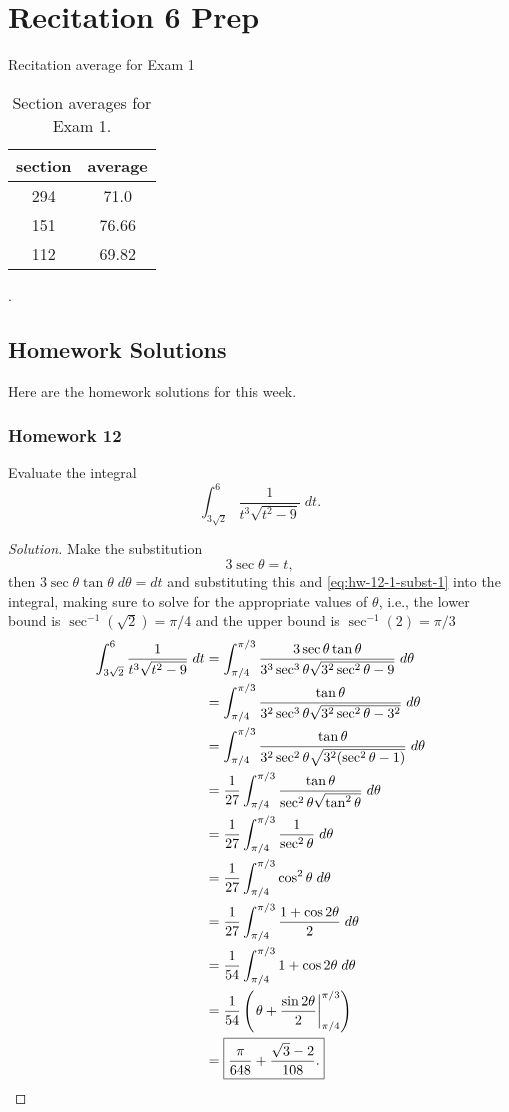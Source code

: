 \chapter{Recitation 6 Prep}
Recitation average for Exam 1
\begin{table}[htbp]
\caption{Section averages for Exam 1.}
\label{tab:sec-avg}
\centering
\begin{tabular}{|c|c|}
\hline
section&average\\
\hline
294&71.0\\
151&76.66\\
112&69.82\\
\hline
\end{tabular}.
\end{table}
\section{Homework Solutions}
Here are the homework solutions for this week.
\subsection{Homework 12}
\begin{problem}[WebAssign, HW 12, \# 1]
Evaluate the integral
\[
\int_{3\sqrt{2}}^6\frac{1}{t^3\sqrt{t^2-9}}\;dt.
\]
\end{problem}
\begin{proof}[Solution]
Make the substitution
\begin{equation}
\label{eq:hw-12-1-subst-1}
3\sec\theta=t,
\end{equation}
then $3\sec\theta\tan\theta\;d\theta=dt$ and substituting this and
\eqref{eq:hw-12-1-subst-1} into the integral, making sure to solve for the
appropriate values of $\theta$, i.e., the lower bound is
$\sec^{-1}\left(\sqrt{2}\right)=\pi/4$ and the upper bound is
$\sec^{-1}(2)=\pi/3$
\begin{align*}
\int_{3\sqrt{2}}^6\frac{1}{t^3\sqrt{t^2-9}}\;dt
&=\int_{\pi/4}^{\pi/3}
\frac{3\sec\theta\tan\theta}{3^3\sec^3\theta\sqrt{3^2\sec^2\theta-9}}\;d\theta\\
&=\int_{\pi/4}^{\pi/3}
\frac{\tan\theta}{3^2\sec^3\theta\sqrt{3^2\sec^2\theta-3^2}}\;d\theta\\
&=\int_{\pi/4}^{\pi/3}
\frac{\tan\theta}{3^2\sec^2\theta\sqrt{3^2(\sec^2\theta-1)}}\;d\theta\\
&=\frac{1}{27}\int_{\pi/4}^{\pi/3}
\frac{\tan\theta}{\sec^2\theta\sqrt{\tan^2\theta}}\;d\theta\\
&=\frac{1}{27}\int_{\pi/4}^{\pi/3}
\frac{1}{\sec^2\theta}\;d\theta\\
&=\frac{1}{27}\int_{\pi/4}^{\pi/3}\cos^2\theta\;d\theta\\
&=\frac{1}{27}\int_{\pi/4}^{\pi/3}\frac{1+\cos2\theta}{2}\;d\theta\\
&=\frac{1}{54}\int_{\pi/4}^{\pi/3}1+\cos2\theta\;d\theta\\
&=\frac{1}{54}\left(\left.\theta+\frac{\sin
  2\theta}{2}\right|_{\pi/4}^{\pi/3}\right)\\
&=\boxed{\frac{\pi}{648}+\frac{\sqrt{3}-2}{108}.}\qedhere
\end{align*}
\end{proof}

